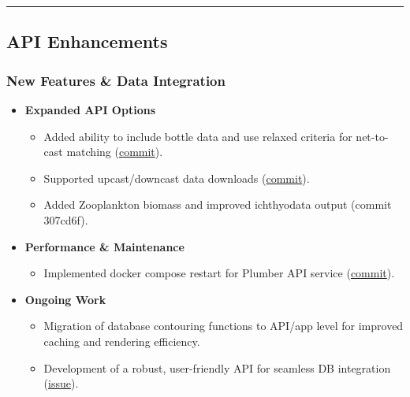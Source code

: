 \documentclass[
  letterpaper,
  DIV=11,
  numbers=noendperiod]{scrreprt}
\providecommand{\tightlist}{%
  \setlength{\itemsep}{0pt}\setlength{\parskip}{0pt}}
\begin{document}
\begin{center}\rule{0.5\linewidth}{0.5pt}\end{center}

\subsection{API Enhancements}\label{api-enhancements}

\subsubsection{New Features \& Data
Integration}\label{new-features-data-integration}

\begin{itemize}
\tightlist
\item
  \textbf{Expanded API Options}

  \begin{itemize}
  \tightlist
  \item
    Added ability to include bottle data and use relaxed criteria for
    net-to-cast matching
    (\href{https://github.com/CalCOFI/api/commit/28f978fd4b5ca00c770f95dd57465b0384665fb6}{commit}).
  \item
    Supported upcast/downcast data downloads
    (\href{https://github.com/CalCOFI/api/commit/b02eccdf262cf9f525ee76a8c03d62efa2573955}{commit}).
  \item
    Added Zooplankton biomass and improved ichthyodata output (commit
    307cd6f).
  \end{itemize}
\item
  \textbf{Performance \& Maintenance}

  \begin{itemize}
  \tightlist
  \item
    Implemented docker compose restart for Plumber API service
    (\href{https://github.com/CalCOFI/api/commit/fae53fdfec9ec9dc48a8182d64f4e8e30c3e7100}{commit}).
  \end{itemize}
\item
  \textbf{Ongoing Work}

  \begin{itemize}
  \tightlist
  \item
    Migration of database contouring functions to API/app level for
    improved caching and rendering efficiency.
  \item
    Development of a robust, user-friendly API for seamless DB
    integration (\href{https://github.com/CalCOFI/api/issues/6}{issue}).
  \end{itemize}
\end{itemize}
\end{document}
